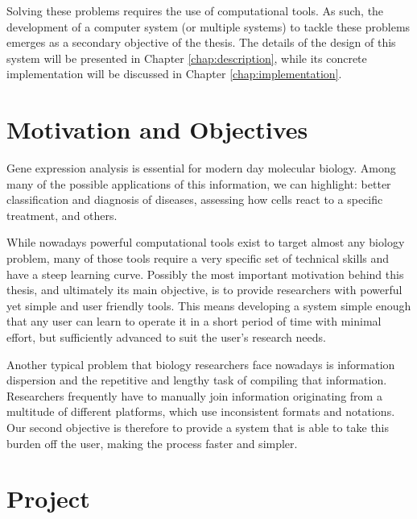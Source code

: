 Solving these problems requires the use of computational tools. As such, the
development of a computer system (or multiple systems) to tackle these problems
emerges as a secondary objective of the thesis. The details of the design of
this system will be presented in Chapter \ref{chap:description}, while its
concrete implementation will be discussed in Chapter \ref{chap:implementation}.

\section{Motivation and Objectives} \label{sec:motivation}


Gene expression analysis is essential for modern day molecular biology. Among
many of the possible applications of this information, we can highlight: better
classification and diagnosis of diseases, assessing how cells react to a
specific treatment, and others.

While nowadays powerful computational tools exist to target almost any biology
problem, many of those tools require a very specific set of technical skills and
have a steep learning curve. Possibly the most important motivation behind this
thesis, and ultimately its main objective, is to provide researchers with
powerful yet simple and user friendly tools. This means developing a system
simple enough that any user can learn to operate it in a short period of time
with minimal effort, but sufficiently advanced to suit the user's research
needs.

Another typical problem that biology researchers face nowadays is information
dispersion and the repetitive and lengthy task of compiling that information.
Researchers frequently have to manually join information originating from a
multitude of different platforms, which use inconsistent formats and notations.
Our second objective is therefore to provide a system that is able to take this
burden off the user, making the process faster and simpler.

\section{Project} \label{sec:project}

